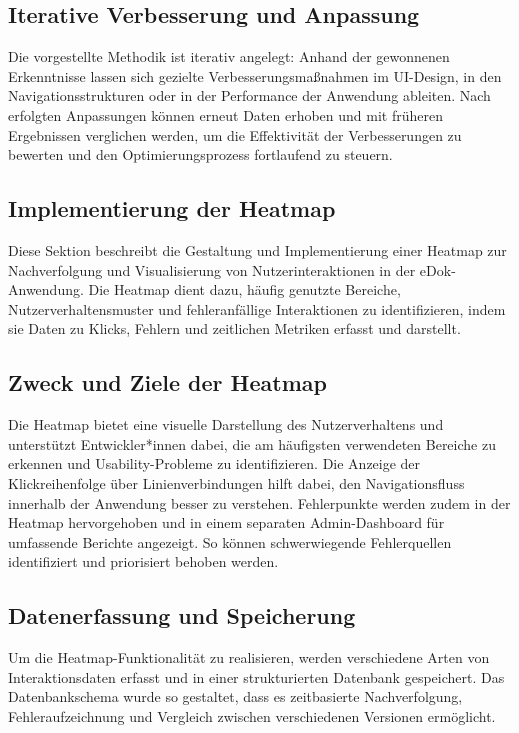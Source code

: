 \documentclass[12pt,oneside]{article}
\begin{document}
\subsection{Iterative Verbesserung und Anpassung}

Die vorgestellte Methodik ist iterativ angelegt: Anhand der gewonnenen Erkenntnisse lassen sich gezielte Verbesserungsmaßnahmen im UI-Design, in den Navigationsstrukturen oder in der Performance der Anwendung ableiten. Nach erfolgten Anpassungen können erneut Daten erhoben und mit früheren Ergebnissen verglichen werden, um die Effektivität der Verbesserungen zu bewerten und den Optimierungsprozess fortlaufend zu steuern.
 

\subsection{Implementierung der Heatmap}
Diese Sektion beschreibt die Gestaltung und Implementierung einer Heatmap zur Nachverfolgung und Visualisierung von Nutzerinteraktionen in der eDok-Anwendung. Die Heatmap dient dazu, häufig genutzte Bereiche, Nutzerverhaltensmuster und fehleranfällige Interaktionen zu identifizieren, indem sie Daten zu Klicks, Fehlern und zeitlichen Metriken erfasst und darstellt.

\subsection{Zweck und Ziele der Heatmap}
Die Heatmap bietet eine visuelle Darstellung des Nutzerverhaltens und unterstützt Entwickler*innen dabei, die am häufigsten verwendeten Bereiche zu erkennen und Usability-Probleme zu identifizieren. Die Anzeige der Klickreihenfolge über Linienverbindungen hilft dabei, den Navigationsfluss innerhalb der Anwendung besser zu verstehen. Fehlerpunkte werden zudem in der Heatmap hervorgehoben und in einem separaten Admin-Dashboard für umfassende Berichte angezeigt. So können schwerwiegende Fehlerquellen identifiziert und priorisiert behoben werden.

\subsection{Datenerfassung und Speicherung}
Um die Heatmap-Funktionalität zu realisieren, werden verschiedene Arten von Interaktionsdaten erfasst und in einer strukturierten Datenbank gespeichert. Das Datenbankschema wurde so gestaltet, dass es zeitbasierte Nachverfolgung, Fehleraufzeichnung und Vergleich zwischen verschiedenen Versionen ermöglicht.
\end{document}
